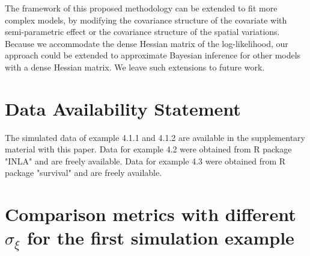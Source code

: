 \documentclass[ba]{imsart}
\begin{document}
The framework of this proposed methodology can be extended to fit more complex models, by modifying the covariance structure of the covariate with semi-parametric effect or the covariance structure of the spatial variations. Because we accommodate the dense Hessian matrix of the log-likelihood, our approach could be extended to approximate Bayesian inference for other models with a dense Hessian matrix. We leave such extensions to future work.

\section*{Data Availability Statement}
The simulated data of example 4.1.1 and 4.1.2 are available in the supplementary material with this paper. Data for example 4.2 were obtained from R package "INLA" \citep{inla} and are freely available.
Data for example 4.3 were obtained from R package "survival" \citep{survival-package} and are freely available. 

\clearpage

\appendix

\section{Comparison metrics with different $\sigma_\xi$ for the first simulation example}

\begin{table}[ht]
  \begin{center}
  \end{center}
  \caption{Comparison metrics in terms of MSE and posterior coverage rate from 500 independent replications when $\sigma_\xi = 1.3$, for the 60 frailty effects and the fixed effect in the first simulation study in section \ref{subsubsec:sim1}.}
  \label{table:Sim1Agg1}
  \end{table}
  
\end{document}
